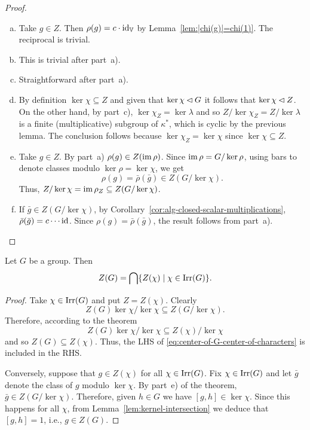 \begin{proof}${}$
    \begin{enumerate}[a),font=\upshape]
        \item Take $g\in Z$. Then $\rho(g)=c\cdot\operatorname{id}_{\mathbb V}$ by Lemma~\ref{lem:|chi(g)|=chi(1)}. The reciprocal is trivial.

        \item This is trivial after part~a).

        \item Straightforward after part~a).

        \item By definition $\ker\chi\subseteq Z$ and given that $\ker\chi\lhd G$ it follows that $\ker\chi\lhd Z$. On the other hand, by part~c), $\ker\chi_Z=\ker\lambda$ and so $Z/\ker\chi_Z=Z/\ker\lambda$ is a finite (multiplicative) subgroup of $\kappa^*$, which is cyclic by the previous lemma. The conclusion follows because $\ker\chi_Z=\ker\chi$ since $\ker\chi\subseteq Z$.

        \item Take $g\in Z$. By part~a) $\rho(g)\in Z(\operatorname{im}\rho)$. Since $\operatorname{im}\rho=G/\ker\rho$, using bars to denote classes modulo $\ker\rho=\ker\chi$, we get 
        $$
            \rho(g)=\bar\rho(\bar g)\in Z(G/\ker\chi).
        $$
        Thus, $Z/\ker\chi=\operatorname{im}\rho_Z\subseteq Z(G/\ker\chi)$.

        \item If $\bar g\in Z(G/\ker\chi)$, by Corollary~\ref{cor:alg-closed-scalar-multiplications}, $\bar\rho(\bar g)=c\cdots\operatorname{id}$. Since $\rho(g)=\bar\rho(\bar g)$, the result follows from part~a).
    \end{enumerate}
\end{proof}

\begin{cor}
    Let $G$ be a group. Then
    \begin{equation}\label{eq:center-of-G-center-of-characters}
        Z(G) = \bigcap\{Z(\chi)\mid \chi\in\operatorname{Irr}(G)\}.
    \end{equation}
\end{cor}

\begin{proof}
    Take $\chi\in\operatorname{Irr}(G)$ and put $Z=Z(\chi)$. Clearly 
    $$
        Z(G)\ker\chi/\ker\chi\subseteq Z(G/\ker\chi).
    $$
    Therefore, according to the theorem
    $$
        Z(G)\ker\chi/\ker\chi
            \subseteq Z(\chi)/\ker\chi
    $$
    and so $Z(G)\subseteq Z(\chi)$. Thus, the LHS of \eqref{eq:center-of-G-center-of-characters} is included in the RHS.

    Conversely, suppose that $g\in Z(\chi)$ for all $\chi\in\operatorname{Irr}(G)$. Fix $\chi\in\operatorname{Irr}(G)$ and let $\bar g$ denote the class of $g$ modulo $\ker\chi$. By part~e) of the theorem, $\bar g\in Z(G/\ker\chi)$. Therefore, given $h\in G$ we have $[g,h]\in\ker\chi$. Since this happens for all $\chi$, from Lemma~\ref{lem:kernel-intersection} we deduce that $[g,h]=1$, i.e., $g\in Z(G)$.
\end{proof}


